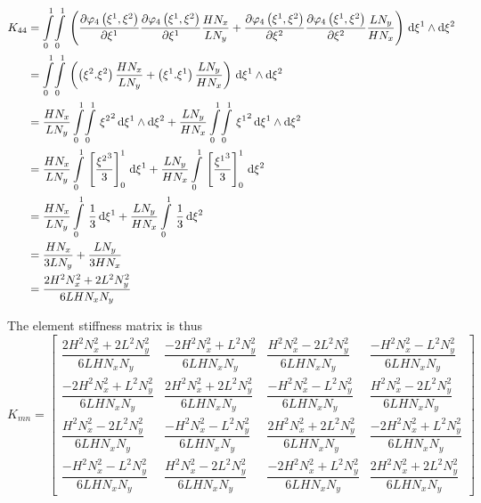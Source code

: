 \begin{equation}
  \begin{aligned}
    K_{44}&=\giint{0}{1}{0}{1}{\pbrac{\delby{\lbfn{4}{\xione,\xitwo}}{\xione}\delby{\lbfn{4}{\xione,\xitwo}}{\xione}
        \dfrac{H N_{x}}{L N_{y}}+\delby{\lbfn{4}{\xione,\xitwo}}{\xitwo}\delby{\lbfn{4}{\xione,\xitwo}}{\xitwo}
        \dfrac{L N_{y}}{H N_{x}}}}{\xione}{\xitwo}\\
    &=\giint{0}{1}{0}{1}{\pbrac{\pbrac{\xitwo.\xitwo}\dfrac{H N_{x}}{L N_{y}}+
    \pbrac{\xione.\xione}\dfrac{L N_{y}}{H N_{x}}}}{\xione}{\xitwo} \\
    &=\dfrac{H N_{x}}{L N_{y}}\giint{0}{1}{0}{1}{\xitwosq}{\xione}{\xitwo}+
    \dfrac{L N_{y}}{H N_{x}}\giint{0}{1}{0}{1}{\xionesq}{\xione}{\xitwo} \\
    &=\dfrac{H N_{x}}{L N_{y}}\gint{0}{1}{\sqbrac{\dfrac{\xitwocube}{3}}_{0}^{1}}{\xione}+
    \dfrac{L N_{y}}{H N_{x}}\gint{0}{1}{\sqbrac{\dfrac{\xionecube}{3}}_{0}^{1}}{\xitwo} \\
    &=\dfrac{H N_{x}}{L N_{y}}\gint{0}{1}{\dfrac{1}{3}}{\xione}+\dfrac{L N_{y}}{H N_{x}}\gint{0}{1}{\dfrac{1}{3}}{\xitwo} \\
    &=\dfrac{H N_{x}}{3 L N_{y}}+\dfrac{L N_{y}}{3 H N_{x}} \\
    &=\dfrac{2 H^{2}N_{x}^{2}+2 L^{2}N_{y}^{2}}{6 L H N_{x} N_{y}}
  \end{aligned}
\end{equation}

The element stiffness matrix is thus
\begin{equation}
  K_{mn}=\begin{bmatrix}
  \dfrac{2 H^{2}N_{x}^{2}+2 L^{2}N_{y}^{2}}{6 L H N_{x} N_{y}} & \dfrac{-2 H^{2}N_{x}^{2}+L^{2}N_{y}^{2}}{6 L H N_{x} N_{y}} &
  \dfrac{H^{2}N_{x}^{2}-2 L^{2}N_{y}^{2}}{6 L H N_{x} N_{y}} & \dfrac{-H^{2}N_{x}^{2}-L^{2}N_{y}^{2}}{6 L H N_{x} N_{y}} \\
  \dfrac{-2 H^{2}N_{x}^{2}+ L^{2}N_{y}^{2}}{6 L H N_{x} N_{y}} & \dfrac{2 H^{2}N_{x}^{2}+2 L^{2}N_{y}^{2}}{6 L H N_{x} N_{y}} &
  \dfrac{-H^{2}N_{x}^{2}-L^{2}N_{y}^{2}}{6 L H N_{x} N_{y}} & \dfrac{H^{2}N_{x}^{2}- 2 L^{2}N_{y}^{2}}{6 L H N_{x} N_{y}} \\
  \dfrac{H^{2}N_{x}^{2}-2 L^{2}N_{y}^{2}}{6 L H N_{x} N_{y}} & \dfrac{-H^{2}N_{x}^{2}-L^{2}N_{y}^{2}}{6 L H N_{x} N_{y}} &
  \dfrac{2 H^{2}N_{x}^{2}+2 L^{2}N_{y}^{2}}{6 L H N_{x} N_{y}} & \dfrac{-2 H^{2}N_{x}^{2}+L^{2}N_{y}^{2}}{6 L H N_{x} N_{y}} \\
  \dfrac{-H^{2}N_{x}^{2}-L^{2}N_{y}^{2}}{6 L H N_{x} N_{y}} & \dfrac{H^{2}N_{x}^{2}-2 L^{2}N_{y}^{2}}{6 L H N_{x} N_{y}} &
  \dfrac{-2 H^{2}N_{x}^{2}+L^{2}N_{y}^{2}}{6 L H N_{x} N_{y}} & \dfrac{2 H^{2}N_{x}^{2}+2 L^{2}N_{y}^{2}}{6 L H N_{x} N_{y}}
  \end{bmatrix}
  \label{eqn:FEMTwoDLaplaceElementStiffnessMatrix}
\end{equation}


